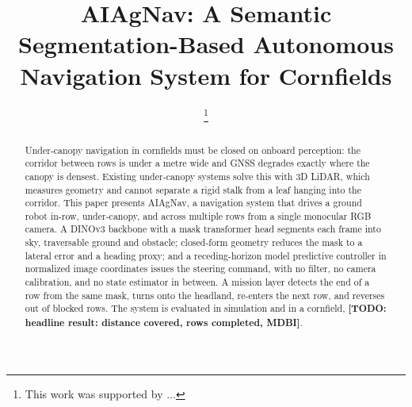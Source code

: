 \documentclass[conference]{IEEEtran}
\newcommand{\TODO}[1]{\textbf{[TODO: #1]}}
\begin{document}
\title{AIAgNav: A Semantic Segmentation-Based Autonomous\\
       Navigation System for Cornfields}

\author{
%
\thanks{This work was supported by ...}}

\maketitle

\begin{abstract}
Under-canopy navigation in cornfields must be closed on onboard perception:
the corridor between rows is under a metre wide and GNSS degrades exactly where
the canopy is densest. Existing under-canopy systems solve this with 3D LiDAR,
which measures geometry and cannot separate a rigid stalk from a leaf hanging
into the corridor.
This paper presents AIAgNav, a navigation system that drives a ground robot
in-row, under-canopy, and across multiple rows from a single monocular RGB
camera. A DINOv3 backbone with a mask transformer head segments each frame into
sky, traversable ground and obstacle; closed-form geometry reduces the mask to a
lateral error and a heading proxy; and a receding-horizon model predictive
controller in normalized image coordinates issues the steering command, with no
filter, no camera calibration, and no state estimator in between. A mission
layer detects the end of a row from the same mask, turns onto the headland,
re-enters the next row, and reverses out of blocked rows. The
system is evaluated in simulation and in a cornfield,
\TODO{headline result: distance covered, rows completed, MDBI}.
\end{abstract}

\end{document}
